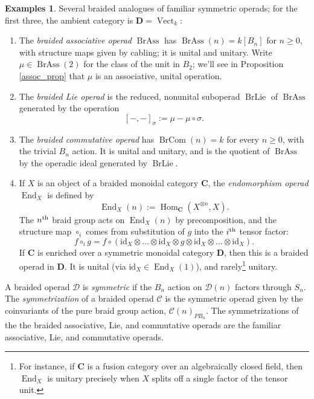 \documentclass[12pt]{article}
\DeclareMathOperator{\Hom}{Hom}
\DeclareMathOperator{\End}{End}
\DeclareMathOperator{\BrAss}{BrAss}
\DeclareMathOperator{\BrLie}{BrLie}
\DeclareMathOperator{\BrCom}{BrCom}
\DeclareMathOperator{\Vect}{Vect}
\newcommand{\CC} {\mathcal{C}}
\newcommand{\DD} {\mathcal{D}}
\newcommand{\bC} {\mathbf{C}}
\newcommand{\bD} {\mathbf{D}}
\newcommand{\id}{\mbox{id}}
\newcommand{\nth}{\textsuperscript{th}}
\theoremstyle{plain}
\theoremstyle{definition}
\newtheorem{exmps}[thm]{Examples}
\theoremstyle{remark}
\begin{document}
\begin{exmps} Several braided analogues of familiar symmetric operads; for the first three, the ambient category is $\bD = \Vect_k$:
\begin{enumerate} 

\item The \emph{braided associative operad} $\BrAss$ has $\BrAss(n) = k[B_n]$ for $n \geq 0$, with structure maps given by cabling; it is unital and unitary.  Write $\mu \in \BrAss(2)$ for the class of the unit in $B_2$; we'll see in Proposition \ref{assoc_prop} that $\mu$ is an associative, unital operation.

\item The \emph{braided Lie operad} is the reduced, nonunital suboperad $\BrLie$ of $\BrAss$ generated by the operation 
%
$$[-,-]_{\sigma} := \mu - \mu \circ \sigma.$$

\item The \emph{braided commutative operad} has $\BrCom(n) = k$ for every $n \geq 0$, with the trivial $B_n$ action.  It is unital and unitary, and is the quotient of $\BrAss$ by the operadic ideal generated by $\BrLie$.

\item If $X$ is an object of a braided monoidal category $\bC$, the \emph{endomorphism operad} $\End_X$ is defined by
%
$$\End_X(n) := \Hom_{\bC}(X^{\otimes n}, X).$$
%
The $n\nth$ braid group acts on $\End_X(n)$ by precomposition, and the structure map $\circ_i$ comes from substitution of $g$ into the $i\nth$ tensor factor:
%
$$f \circ_i g = f \circ (\id_X \otimes \dots \otimes \id_X \otimes g \otimes \id_X \otimes \dots \otimes \id_X).$$
%
If $\bC$ is enriched over a symmetric monoidal category $\bD$, then this is a braided operad in $\bD$.  It is unital (via $\id_X \in \End_X(1)$), and rarely\footnote{For instance, if $\bC$ is a fusion category over an algebraically closed field, then $\End_X$ is unitary precisely when $X$ splits off a single factor of the tensor unit.} unitary.

\end{enumerate}

\end{exmps}

A braided operad $\DD$ is \emph{symmetric} if the $B_n$ action on $\DD(n)$ factors through $S_n$.  The \emph{symmetrization} of a braided operad $\CC$ is the symmetric operad given by the coinvariants of the pure braid group action, $\CC(n)_{PB_n}$.  The symmetrizations of the the braided associative, Lie, and commutative operads are the familiar associative, Lie, and commutative operads.  
\end{document}
